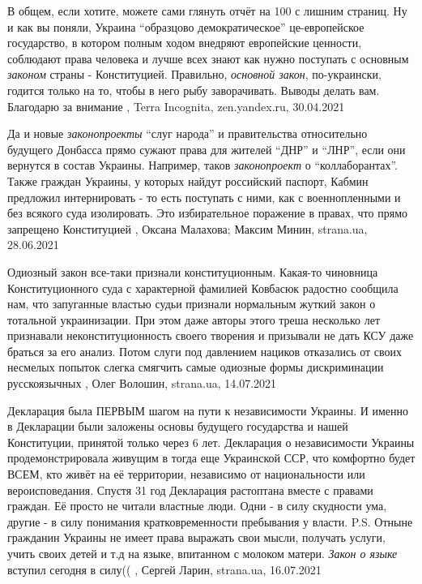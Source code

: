 В общем, если хотите, можете сами глянуть отчёт на 100 с лишним страниц. Ну и
как вы поняли, Украина \enquote{образцово демократическое} це-европейское государство,
в котором полным ходом внедряют европейские ценности, соблюдают права человека
и лучше всех знают как нужно поступать с основным \emph{законом} страны -
Конституцией. Правильно, \emph{основной закон}, по-украински, годится только на то,
чтобы в него рыбу заворачивать.  Выводы делать вам. Благодарю за внимание
, 
Terra Incognita, zen.yandex.ru, 30.04.2021

Да и новые \emph{законопроекты} \enquote{слуг народа} и правительства
относительно будущего Донбасса прямо сужают права для жителей \enquote{ДНР} и
\enquote{ЛНР}, если они вернутся в состав Украины. Например, таков
\emph{законопроект} о \enquote{коллаборантах}. Также граждан Украины, у
которых найдут российский паспорт, Кабмин предложил интернировать - то есть
поступать с ними, как с военнопленными и без всякого суда изолировать. Это
избирательное поражение в правах, что прямо запрещено Конституцией
, 
Оксана Малахова; Максим Минин, strana.ua, 28.06.2021

Одиозный закон все-таки признали конституционным.  Какая-то чиновница
Конституционного суда с характерной фамилией Ковбасюк радостно сообщила нам,
что запуганные властью судьи признали нормальным жуткий закон о тотальной
украинизации. При этом даже авторы этого треша несколько лет признавали
неконституционность своего творения и призывали не дать КСУ даже браться за его
анализ.  Потом слуги под давлением нациков отказались от своих несмелых попыток
слегка смягчить самые одиозные формы дискриминации русскоязычных
, 
Олег Волошин, strana.ua, 14.07.2021

Декларация была ПЕРВЫМ шагом на пути к независимости Украины. И именно в
Декларации были заложены основы будущего государства и нашей Конституции,
принятой только через 6 лет. Декларация о независимости Украины
продемонстрировала живущим в тогда еще Украинской ССР, что комфортно будет
ВСЕМ, кто живёт на её территории, независимо от национальности или
вероисповедания.  Спустя 31 год Декларация растоптана вместе с правами граждан.
Её просто не читали властные люди.  Одни - в силу скудности ума, другие - в
силу понимания кратковременности пребывания у власти.
P.S. Отныне гражданин Украины не имеет права выражать свои мысли, получать
услуги, учить своих детей и т.д на языке, впитанном с молоком матери.
\emph{Закон о языке} вступил сегодня в силу((
, 
Сергей Ларин, strana.ua, 16.07.2021

